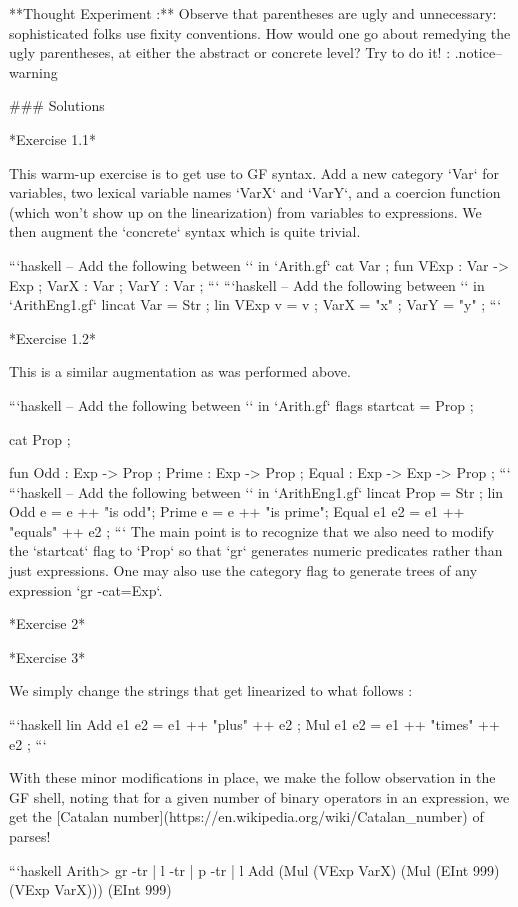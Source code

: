 **Thought Experiment :** Observe that parentheses are ugly and unnecessary:
sophisticated folks use fixity conventions. How would one go about remedying the
ugly parentheses, at either the abstract or concrete level? Try to do it! {:
.notice--warning}

### Solutions

*Exercise 1.1*

This warm-up exercise is to get use to GF syntax. Add a new category `Var` for
variables, two lexical variable names `VarX` and `VarY`, and a coercion function
(which won't show up on the linearization) from variables to expressions. We
then augment the `concrete` syntax which is quite trivial.

```haskell -- Add the following between `{}` in `Arith.gf` cat Var ; fun VExp :
Var -> Exp ; VarX : Var ; VarY : Var ; ``` ```haskell -- Add the following
between `{}` in `ArithEng1.gf` lincat Var = Str ; lin VExp v = v ; VarX = "x" ;
VarY = "y" ; ```

*Exercise 1.2*

This is a similar augmentation as was performed above.

```haskell -- Add the following between `{}` in `Arith.gf` flags startcat = Prop
;

cat Prop ;

fun Odd : Exp -> Prop ; Prime : Exp -> Prop ; Equal : Exp -> Exp -> Prop ; ```
```haskell -- Add the following between `{}` in `ArithEng1.gf` lincat Prop = Str
; lin Odd e = e ++ "is odd"; Prime e = e ++ "is prime"; Equal e1 e2 = e1 ++
"equals" ++ e2 ; ``` The main point is to recognize that we also need to modify
the `startcat` flag to `Prop` so that `gr` generates numeric predicates rather
than just expressions. One may also use the category flag to generate trees of
any expression `gr -cat=Exp`.

*Exercise 2*

*Exercise 3*

We simply change the strings that get linearized to what follows :

```haskell lin Add e1 e2 = e1 ++ "plus" ++ e2 ; Mul e1 e2 = e1 ++ "times" ++ e2
; ```

With these minor modifications in place, we make the follow observation in the
GF shell, noting that for a given number of binary operators in an expression,
we get the [Catalan number](https://en.wikipedia.org/wiki/Catalan_number) of
parses!

```haskell Arith> gr -tr | l -tr | p -tr | l Add (Mul (VExp VarX) (Mul (EInt
999) (VExp VarX))) (EInt 999)

